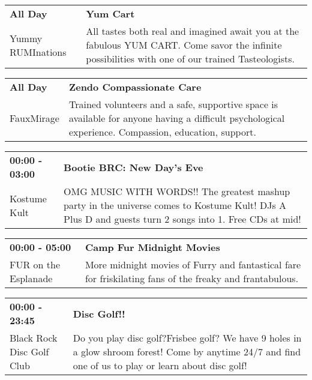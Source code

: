 \begin{tabular}{ p{1in} p{2.2in} }
    \textbf{All Day} & \textbf{Yum Cart} \\
    Yummy RUMInations \newline  & All tastes both real and imagined await you at the fabulous YUM CART. Come savor the infinite possibilities with one of our trained Tasteologists. \\
    \hline 
\end{tabular}
    
\begin{tabular}{ p{1in} p{2.2in} }
    \textbf{All Day} & \textbf{Zendo Compassionate Care } \\
    FauxMirage \newline  & Trained volunteers and a safe, supportive space is available for anyone having a difficult psychological experience. Compassion, education, support. \\
    \hline 
\end{tabular}
    
\begin{tabular}{ p{1in} p{2.2in} }
    \textbf{00:00 - 03:00} & \textbf{Bootie BRC: New Day's Eve} \\
    Kostume Kult \newline  & OMG MUSIC WITH WORDS!! The greatest mashup party in the universe comes to Kostume Kult! DJs A Plus D and guests turn 2 songs into 1. Free CDs at mid! \\
    \hline 
\end{tabular}
    
\begin{tabular}{ p{1in} p{2.2in} }
    \textbf{00:00 - 05:00} & \textbf{Camp Fur Midnight Movies } \\
    FUR \newline 6.45 on the Esplanade & More midnight movies of Furry and  fantastical fare for friskilating fans of the freaky and frantabulous. \\
    \hline 
\end{tabular}
    
\begin{tabular}{ p{1in} p{2.2in} }
    \textbf{00:00 - 23:45} & \textbf{Disc Golf!!} \\
    Black Rock Disc Golf Club \newline  & Do you play disc golf?Frisbee golf? We have 9 holes in a glow shroom forest! Come by anytime 24/7 and find one of us to play or learn about disc golf! \\
    \hline 
\end{tabular}
    
